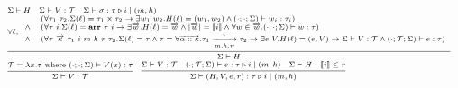 \documentclass[fleqn]{article}
\begin{document}
\[
\scriptsize
\begin{array}{l}
	\Sigma \vdash H \hspace{1em} \Sigma \vdash V : \mathcal{T} \hspace{1em} \Sigma \vdash \sigma : \tau \triangleright i \mid (m, h) \\
	\infer{\Sigma \vdash H}{\forall \ell, \begin{array}{cl} & (\forall \tau_1~\tau_2. \Sigma(\ell) = \tau_1 \times \tau_2 \rightarrow \exists w_1~w_2. H(\ell) = (w_1,w_2) \land (\cdot;\cdot;\Sigma) \vdash w_i : \tau_i ) \\ \land & (\forall \tau~i. \Sigma(\ell)= \mathbf{arr}~\tau~i \rightarrow \exists \overrightarrow{w}. H(\ell) = \overrightarrow{w} \land |\overrightarrow{w}| = \llbracket i \rrbracket \land \forall w \in \overrightarrow{w}. (\cdot;\cdot;\Sigma) \vdash w : \tau  ) \\ \land & (\forall \tau~\overrightarrow{\kappa}~\tau_1~i~m~h~r~\tau_2. \Sigma(\ell)=\tau \land \tau=\forall \overrightarrow{\alpha::\kappa}. \tau_1 \xrightarrow[m,h,r]{i} \tau_2 \rightarrow \exists e~V. H(\ell) = (e, V) \rightarrow \Sigma \vdash V : \mathcal{T} \land (\cdot;\mathcal{T};\Sigma) \vdash e : \tau ) \end{array} } \\
	\infer{\Sigma \vdash V : \mathcal{T}}{\mathcal{T} = \lambda x. \tau \mathrm{~where~} (\cdot;\cdot;\Sigma) \vdash V(x) : \tau   } \hspace{1em}
	\infer{\Sigma \vdash (H,V,e,r) : \tau \triangleright i \mid (m, h)}{\Sigma \vdash V : \mathcal{T} & (\cdot;\mathcal{T};\Sigma) \vdash e : \tau \triangleright i \mid (m,h) & \Sigma \vdash H & \llbracket i \rrbracket \le r}
\end{array}
\]
\end{document}

